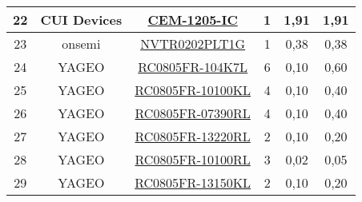 \begin{table}[H]
\begin{tabular}{|c|c|c|c|c|c|}
22                   & CUI Devices         & \href{https://www.cuidevices.com/product/resource/cem-1205-ic.pdf}{CEM-1205-IC}                                                                                                                                        & 1        & 1,91            & 1,91            \\ \hline
23                   & onsemi              & \href{https://componentsearchengine.com/Datasheets/2/NVTR0202PLT1G.pdf}{NVTR0202PLT1G}                                                                                                                                 & 1        & 0,38            & 0,38            \\ \hline
24                   & YAGEO               & \href{https://ar.mouser.com/datasheet/2/447/PYu_RC_Group_51_RoHS_L_11-1984063.pdf}{RC0805FR-104K7L}                                                                                                              & 6        & 0,10            & 0,60            \\ \hline
25                   & YAGEO               & \href{https://ar.mouser.com/datasheet/2/447/YAGEO_PYu_RC_Group_51_RoHS_L_12-3313492.pdf}{RC0805FR-10100KL}                                                                                                      & 4        & 0,10            & 0,40            \\ \hline
26                   & YAGEO               & \href{https://ar.mouser.com/datasheet/2/447/YAGEO_PYu_RC_Group_51_RoHS_L_12-3313492.pdf}{RC0805FR-07390RL}                                                                                                      & 4        & 0,10            & 0,40            \\ \hline
27                   & YAGEO               & \href{https://ar.mouser.com/datasheet/2/447/PYu_RC_Group_51_RoHS_L_11-1984063.pdf}{RC0805FR-13220RL}                                                                                                             & 2        & 0,10            & 0,20            \\ \hline
28                   & YAGEO               & \href{https://ar.mouser.com/datasheet/2/447/PYu_RC_Group_51_RoHS_L_11-1984063.pdf}{RC0805FR-10100RL}                                                                                                             & 3        & 0,02            & 0,05            \\ \hline
29                   & YAGEO               & \href{https://ar.mouser.com/datasheet/2/447/PYu_RC_Group_51_RoHS_L_11-1984063.pdf}{RC0805FR-13150KL}                                                                                                             & 2        & 0,10            & 0,20            \\ \hline

\end{tabular}
\end{table}

